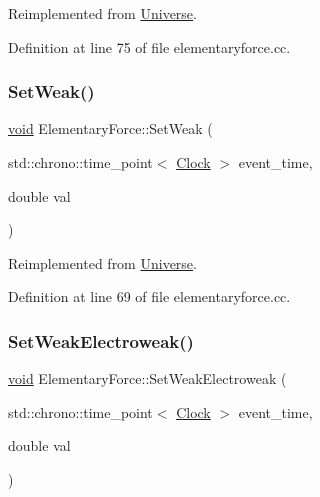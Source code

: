 Reimplemented from \mbox{\hyperlink{class_universe_a1b2d6197ddf3d613cc30bd04d22ed8b7}{Universe}}.



Definition at line 75 of file elementaryforce.\+cc.

\mbox{\label{class_elementary_force_a093cdf0810e95f1d973bd9dc88c6788b}} 
\subsubsection{\texorpdfstring{Set\+Weak()}{SetWeak()}}
{\footnotesize\ttfamily \mbox{\hyperlink{glad_8h_a950fc91edb4504f62f1c577bf4727c29}{void}} Elementary\+Force\+::\+Set\+Weak (\begin{DoxyParamCaption}\item[{std\+::chrono\+::time\+\_\+point$<$ \mbox{\hyperlink{universe_8h_a0ef8d951d1ca5ab3cfaf7ab4c7a6fd80}{Clock}} $>$}]{event\+\_\+time,  }\item[{double}]{val }\end{DoxyParamCaption})\hspace{0.3cm}{\ttfamily [virtual]}}



Reimplemented from \mbox{\hyperlink{class_universe_a0f5cd04081b41ee931c0557dc397f6fb}{Universe}}.



Definition at line 69 of file elementaryforce.\+cc.

\mbox{\label{class_elementary_force_a38d4f86f18a9f84a4198ee43bc90f6b4}} 
\subsubsection{\texorpdfstring{Set\+Weak\+Electroweak()}{SetWeakElectroweak()}}
{\footnotesize\ttfamily \mbox{\hyperlink{glad_8h_a950fc91edb4504f62f1c577bf4727c29}{void}} Elementary\+Force\+::\+Set\+Weak\+Electroweak (\begin{DoxyParamCaption}\item[{std\+::chrono\+::time\+\_\+point$<$ \mbox{\hyperlink{universe_8h_a0ef8d951d1ca5ab3cfaf7ab4c7a6fd80}{Clock}} $>$}]{event\+\_\+time,  }\item[{double}]{val }\end{DoxyParamCaption})\hspace{0.3cm}{\ttfamily [virtual]}}



